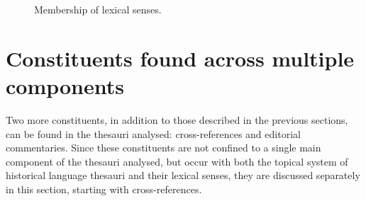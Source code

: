 \begin{figure}[htbp]
	\framebox[\textwidth]{
		\scalebox{0.65}[0.65]{
		    
%            
		}
	}
	\caption[]{\label{fig:Stolk_thes-content:synset-vs-semfield}  Membership of lexical senses.
}
\end{figure}


\section{Constituents found across multiple components}
\label{sect:Stolk_thes-content:CommonConstituents}

Two more constituents, in addition to those described in the previous sections, can be found in the thesauri analysed: cross-references and editorial commentaries.
Since these constituents are not confined to a single main component of the thesauri analysed, but occur with both the topical system of historical language thesauri and their lexical senses, they are discussed separately in this section, starting with cross-references.

